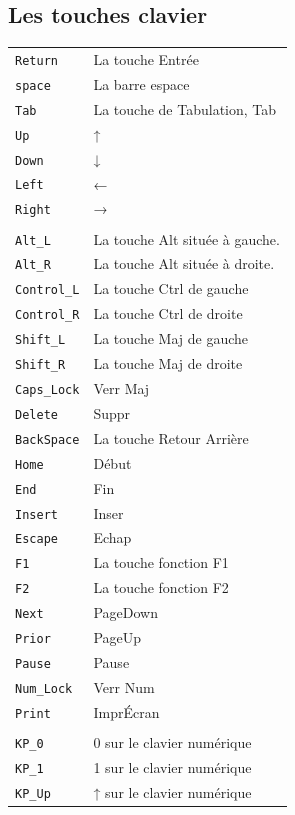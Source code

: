 \documentclass[11pt,a4paper]{article}
\begin{document}
\subsection*{Les touches clavier}
\begin{tabular}{ll}
{\tt Return} 	& 	La touche Entrée\\
{\tt space} 	& 	La barre espace\\
{\tt Tab} 	& 	La touche de Tabulation, Tab\\

{\tt Up} 	& 	↑\\
{\tt Down} 	& 	↓\\
{\tt Left} 	& 	←\\
{\tt Right} 	& 	→\\
&\\
{\tt Alt\_L} 	& 	La touche Alt située à gauche.\\
{\tt Alt\_R} 	& 	La touche Alt située à droite.\\
{\tt Control\_L} 	& 	La touche Ctrl de gauche\\
{\tt Control\_R} 	& 	La touche Ctrl de droite\\
{\tt Shift\_L} 	& 	La touche Maj de gauche\\
{\tt Shift\_R} 	& 	La touche Maj de droite\\
{\tt Caps\_Lock} 	& 	Verr Maj\\
{\tt Delete} 	& 	Suppr\\
{\tt BackSpace} 	& 	La touche Retour Arrière\\
{\tt Home} 	& 	Début\\
{\tt End} 	& 	Fin\\
{\tt Insert} 	& 	Inser\\
{\tt Escape} 	& 	Echap\\
{\tt F1} 	& 	La touche fonction F1\\
{\tt F2} 	& 	La touche fonction F2\\
{\tt Next} 	& 	PageDown\\
{\tt Prior} 	& 	PageUp\\
{\tt Pause} 	& 	Pause\\
{\tt Num\_Lock} 	& 	Verr Num\\
{\tt Print} 	& 	ImprÉcran\\
&\\
{\tt KP\_0} 	& 	0 sur le clavier numérique\\
{\tt KP\_1} 	& 	1 sur le clavier numérique\\
{\tt KP\_Up} 	& 	↑ sur le clavier numérique\\

\end{tabular}
\end{document}

